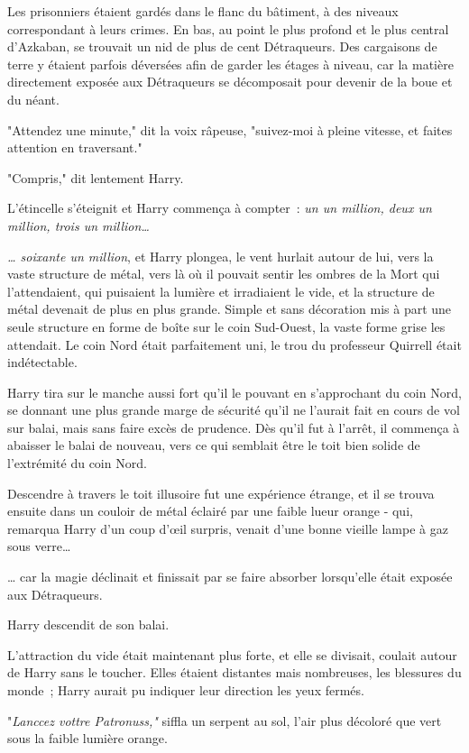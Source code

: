 Les prisonniers étaient gardés dans le flanc du bâtiment, à des niveaux correspondant à leurs crimes. En bas, au point le plus profond et le plus central d'Azkaban, se trouvait un nid de plus de cent Détraqueurs. Des cargaisons de terre y étaient parfois déversées afin de garder les étages à niveau, car la matière directement exposée aux Détraqueurs se décomposait pour devenir de la boue et du néant.

"Attendez une minute," dit la voix râpeuse, "suivez-moi à pleine vitesse, et faites attention en traversant."

"Compris," dit lentement Harry.

L'étincelle s'éteignit et Harry commença à compter~: \emph{un un million, deux un million, trois un million…}

\emph{… soixante un million}, et Harry plongea, le vent hurlait autour de lui, vers la vaste structure de métal, vers là où il pouvait sentir les ombres de la Mort qui l'attendaient, qui puisaient la lumière et irradiaient le vide, et la structure de métal devenait de plus en plus grande. Simple et sans décoration mis à part une seule structure en forme de boîte sur le coin Sud-Ouest, la vaste forme grise les attendait. Le coin Nord était parfaitement uni, le trou du professeur Quirrell était indétectable.

Harry tira sur le manche aussi fort qu'il le pouvant en s'approchant du coin Nord, se donnant une plus grande marge de sécurité qu'il ne l'aurait fait en cours de vol sur balai, mais sans faire excès de prudence. Dès qu'il fut à l'arrêt, il commença à abaisser le balai de nouveau, vers ce qui semblait être le toit bien solide de l'extrémité du coin Nord.

Descendre à travers le toit illusoire fut une expérience étrange, et il se trouva ensuite dans un couloir de métal éclairé par une faible lueur orange - qui, remarqua Harry d'un coup d'œil surpris, venait d'une bonne vieille lampe à gaz sous verre…

… car la magie déclinait et finissait par se faire absorber lorsqu'elle était exposée aux Détraqueurs.

Harry descendit de son balai.

L'attraction du vide était maintenant plus forte, et elle se divisait, coulait autour de Harry sans le toucher. Elles étaient distantes mais nombreuses, les blessures du monde~; Harry aurait pu indiquer leur direction les yeux fermés.

"\emph{Lanccez vottre Patronuss,"} siffla un serpent au sol, l'air plus décoloré que vert sous la faible lumière orange.

